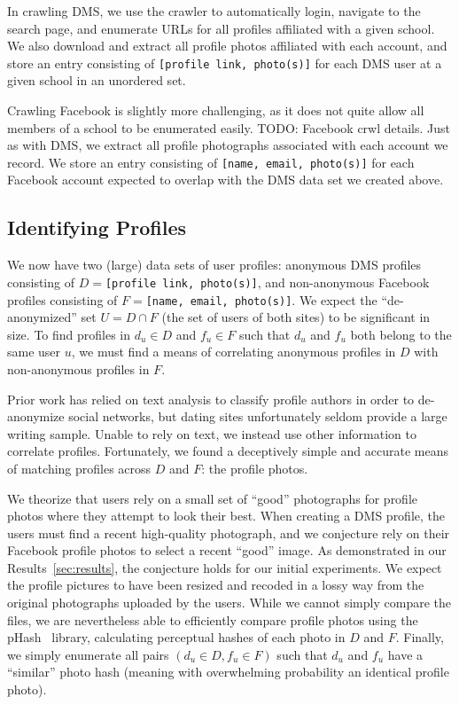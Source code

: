 In crawling DMS, we use the crawler to automatically login, navigate to the search page, and enumerate URLs for all profiles affiliated with a given school. We also download and extract all profile photos affiliated with each account, and store an entry consisting of \texttt{[profile link, photo(s)]} for each DMS user at a given school in an unordered set.

Crawling Facebook is slightly more challenging, as it does not quite allow all members of a school to be enumerated easily. TODO: Facebook crwl details.
Just as with DMS, we extract all profile photographs associated with each account we record.
We store an entry consisting of \texttt{[name, email, photo(s)]} for each Facebook account expected to overlap with the DMS data set we created above.

\subsection{Identifying Profiles}
\label{sec:design_profile}

We now have two (large) data sets of user profiles: anonymous DMS profiles consisting of $D = $\texttt{[profile link, photo(s)]}, and non-anonymous Facebook profiles consisting of $F = $\texttt{[name, email, photo(s)]}.
We expect the ``de-anonymized'' set $U = D \cap F$  (the set of users of both sites) to be significant in size.
To find profiles in $d_u \in D$ and $f_u \in F$ such that $d_u$ and $f_u$ both belong to the same user $u$, we must find a means of correlating anonymous profiles in $D$ with non-anonymous profiles in $F$.

Prior work has relied on text analysis to classify profile authors in order to de-anonymize social networks, but dating sites unfortunately seldom provide a large writing sample.
Unable to rely on text, we instead use other information to correlate profiles.
Fortunately, we found a deceptively simple and accurate means of matching profiles across $D$ and $F$: the profile photos.

We theorize that users rely on a small set of ``good'' photographs for profile photos where they attempt to look their best.
When creating a DMS profile, the users must find a recent high-quality photograph, and we conjecture rely on their Facebook profile photos to select a recent ``good'' image.
As demonstrated in our Results~\ref{sec:results}, the conjecture holds for our initial experiments.
We expect the profile pictures to have been resized and recoded in a lossy way from the original photographs uploaded by the users.
While we cannot simply compare the files, we are nevertheless able to efficiently compare profile photos using the pHash~\cite{phash} library, calculating perceptual hashes of each photo in $D$ and $F$.
Finally, we simply enumerate all pairs $(d_u \in D, f_u \in F)$ such that $d_u$ and $f_u$ have a ``similar'' photo hash (meaning with overwhelming probability an identical profile photo).

